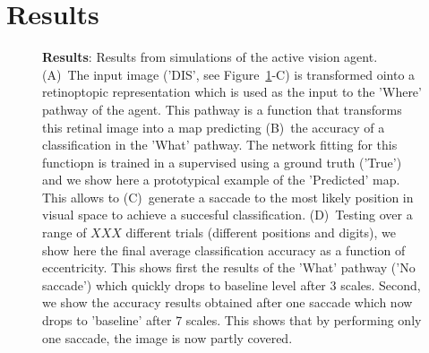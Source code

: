 \section{Results}
\label{sec:results}



\begin{figure}%
\caption{
{\bf Results}: Results from simulations of the active vision agent.
(A)~The input image ('DIS', see  Figure~\ref{fig:results}-C)  is transformed ointo a retinoptopic representation which is used as the input to the 'Where' pathway of the agent. This pathway is a function that transforms this retinal image into a map predicting (B)~the accuracy of a classification in the 'What' pathway. The network fitting for this functiopn is trained in a supervised using a ground truth ('True') and we show here a prototypical example of the 'Predicted' map. This allows to (C)~generate a saccade to the most likely position in visual space to achieve a succesful classification. (D)~Testing over a range of $XXX$ different trials (different positions and digits), we show here the final average classification accuracy as a function of eccentricity. This shows first the results of the 'What' pathway ('No saccade') which quickly drops to baseline level after 3 scales. Second, we show the accuracy results obtained after one saccade which now drops to 'baseline' after 7 scales. This shows that by performing only one saccade, the image is now partly covered.
\label{fig:results}}%
\end{figure}%




